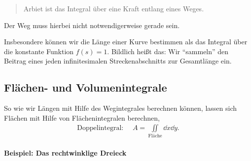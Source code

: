 \begin{quote}
    Arbiet ist das Integral über eine Kraft entlang eines Weges.
\end{quote}
Der Weg muss hierbei nicht notwendigerweise gerade sein. 
\begin{figure}[htp]
    \centering
\end{figure}
Insbesondere können wir die Länge einer Kurve bestimmen als das Integral über die konstante Funktion $f(s) = 1$. Bildlich heißt das: Wir ``sammeln'' den Beitrag eines jeden infinitesimalen Streckenabschnitts zur Gesamtlänge ein.

\subsection{Flächen- und Volumenintegrale}

So wie wir Längen mit Hilfe des Wegintegrales berechnen können, lassen sich Flächen mit Hilfe von Flächenintegralen berechnen, 
\begin{align}
    \text{Doppelintegral: } \quad A = \iint\limits_{\text{Fläche}} \dd{x}\dd{y}. 
\end{align}

\paragraph{Beispiel: Das rechtwinklige Dreieck}$~$

